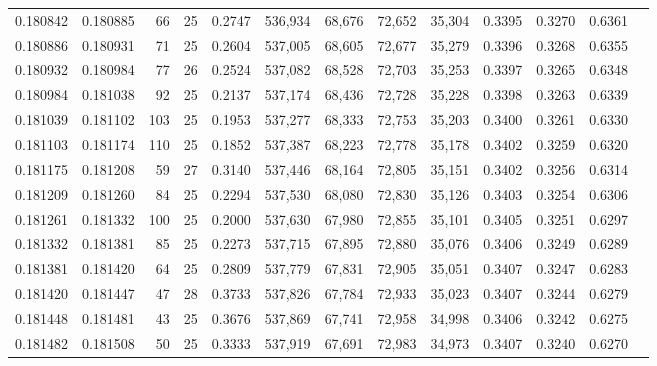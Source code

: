 \begin{tabular}{rrrrrrrrrrrrr}
0.180842 & 0.180885 &    66 &  25 &                                     0.2747 & 536,934 &  68,676 &  72,652 &  35,304 & 0.3395 & 0.3270 & 0.6361 \\
0.180886 & 0.180931 &    71 &  25 &                                     0.2604 & 537,005 &  68,605 &  72,677 &  35,279 & 0.3396 & 0.3268 & 0.6355 \\
0.180932 & 0.180984 &    77 &  26 &                                     0.2524 & 537,082 &  68,528 &  72,703 &  35,253 & 0.3397 & 0.3265 & 0.6348 \\
0.180984 & 0.181038 &    92 &  25 &                                     0.2137 & 537,174 &  68,436 &  72,728 &  35,228 & 0.3398 & 0.3263 & 0.6339 \\
0.181039 & 0.181102 &   103 &  25 &                                     0.1953 & 537,277 &  68,333 &  72,753 &  35,203 & 0.3400 & 0.3261 & 0.6330 \\
0.181103 & 0.181174 &   110 &  25 &                                     0.1852 & 537,387 &  68,223 &  72,778 &  35,178 & 0.3402 & 0.3259 & 0.6320 \\
0.181175 & 0.181208 &    59 &  27 &                                     0.3140 & 537,446 &  68,164 &  72,805 &  35,151 & 0.3402 & 0.3256 & 0.6314 \\
0.181209 & 0.181260 &    84 &  25 &                                     0.2294 & 537,530 &  68,080 &  72,830 &  35,126 & 0.3403 & 0.3254 & 0.6306 \\
0.181261 & 0.181332 &   100 &  25 &                                     0.2000 & 537,630 &  67,980 &  72,855 &  35,101 & 0.3405 & 0.3251 & 0.6297 \\
0.181332 & 0.181381 &    85 &  25 &                                     0.2273 & 537,715 &  67,895 &  72,880 &  35,076 & 0.3406 & 0.3249 & 0.6289 \\
0.181381 & 0.181420 &    64 &  25 &                                     0.2809 & 537,779 &  67,831 &  72,905 &  35,051 & 0.3407 & 0.3247 & 0.6283 \\
0.181420 & 0.181447 &    47 &  28 &                                     0.3733 & 537,826 &  67,784 &  72,933 &  35,023 & 0.3407 & 0.3244 & 0.6279 \\
0.181448 & 0.181481 &    43 &  25 &                                     0.3676 & 537,869 &  67,741 &  72,958 &  34,998 & 0.3406 & 0.3242 & 0.6275 \\
0.181482 & 0.181508 &    50 &  25 &                                     0.3333 & 537,919 &  67,691 &  72,983 &  34,973 & 0.3407 & 0.3240 & 0.6270 \\

\end{tabular}
